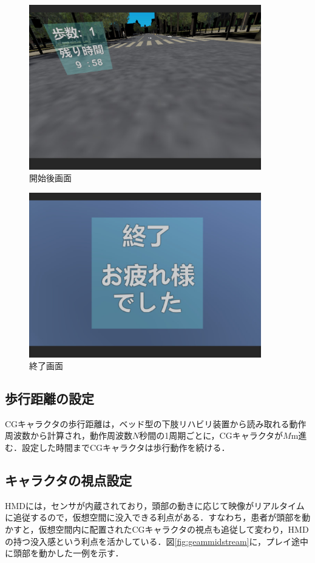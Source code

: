 \begin{figure}[tbp]
	\centering
			\includegraphics[width=0.9\textwidth]{chap2-figure/midstream-1.eps}
	\caption{開始後画面}
	\label{fig:gemestart}
\end{figure}

\begin{figure}[tbp]
	\centering
			\includegraphics[width=0.9\textwidth]{chap2-figure/end.eps}
	\caption{終了画面}
	\label{fig:end}
\end{figure}

\subsection{歩行距離の設定}
CGキャラクタの歩行距離は，ベッド型の下肢リハビリ装置から読み取れる動作周波数から計算され，動作周波数$N$秒間の1周期ごとに，CGキャラクタが$M$m進む．設定した時間までCGキャラクタは歩行動作を続ける．

\subsection{キャラクタの視点設定}
HMDには，センサが内蔵されており，頭部の動きに応じて映像がリアルタイムに追従するので，仮想空間に没入できる利点がある．すなわち，患者が頭部を動かすと，仮想空間内に配置されたCGキャラクタの視点も追従して変わり，HMDの持つ没入感という利点を活かしている．図\ref{fig:geammidstream}に，プレイ途中に頭部を動かした一例を示す．

